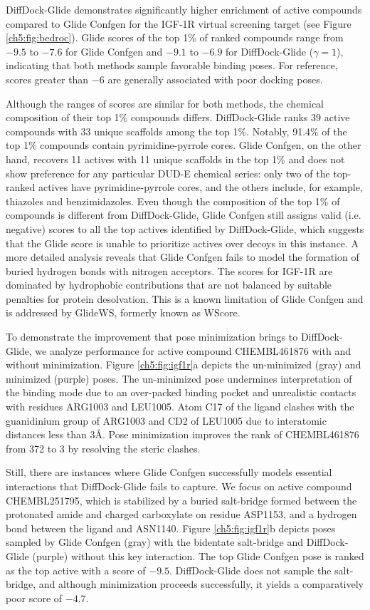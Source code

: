 DiffDock-Glide demonstrates significantly higher enrichment of active compounds compared to Glide Confgen for the IGF-1R virtual screening target (see Figure \ref{ch5:fig:bedroc}). Glide scores of the top 1\% of ranked compounds range from $-9.5$ to $-7.6$ for Glide Confgen and $-9.1$ to $-6.9$ for DiffDock-Glide ($\gamma=1$), indicating that both methods sample favorable binding poses. For reference, scores greater than $-6$ are generally associated with poor docking poses. \cite{friesner2004glide}

Although the ranges of scores are similar for both methods, the chemical composition of their top 1\% compounds differs.
DiffDock-Glide ranks 39 active compounds with 33 unique scaffolds among the top 1\%. Notably, 91.4\% of the top 1\% compounds contain pyrimidine-pyrrole cores. Glide Confgen, on the other hand, recovers 11 actives with 11 unique scaffolds in the top 1\% and does not show preference for any particular DUD-E chemical series: only two of the top-ranked actives have pyrimidine-pyrrole cores, and the others include, for example, thiazoles and benzimidazoles. Even though the composition of the top 1\% of compounds is different from DiffDock-Glide, Glide Confgen still assigns valid (i.e. negative) scores to all the top actives identified by DiffDock-Glide, which suggests that the Glide score is unable to prioritize actives over decoys in this instance. A more detailed analysis reveals that Glide Confgen fails to model the formation of buried hydrogen bonds with nitrogen acceptors. The scores for IGF-1R are dominated by hydrophobic contributions that are not balanced by suitable penalties for protein desolvation. This is a known limitation of Glide Confgen and is addressed by GlideWS, formerly known as WScore.~\cite{murphy2016wscore}

To demonstrate the improvement that pose minimization brings to DiffDock-Glide, we analyze performance for active compound CHEMBL461876 with and without minimization. Figure \ref{ch5:fig:igf1r}a depicts the un-minimized (gray) and minimized (purple) poses. The un-minimized pose undermines interpretation of the binding mode due to an over-packed binding pocket and unrealistic contacts with residues ARG1003 and LEU1005. Atom C17 of the ligand clashes with the guanidinium group of ARG1003 and CD2 of LEU1005 due to interatomic distances less than 3{\AA}. Pose minimization improves the rank of CHEMBL461876 from 372 to 3 by resolving the steric clashes.

Still, there are instances where Glide Confgen successfully models essential interactions that DiffDock-Glide fails to capture. We focus on active compound CHEMBL251795, which is stabilized by a buried salt-bridge formed between the protonated amide and charged carboxylate on residue ASP1153, and a hydrogen bond between the ligand and ASN1140. Figure \ref{ch5:fig:igf1r}b depicts poses sampled by Glide Confgen (gray) with the bidentate salt-bridge and DiffDock-Glide (purple) without this key interaction. The top Glide Confgen pose is ranked as the top active with a score of $-9.5$. DiffDock-Glide does not sample the salt-bridge, and although minimization proceeds successfully, it yields a comparatively poor score of $-4.7$.

